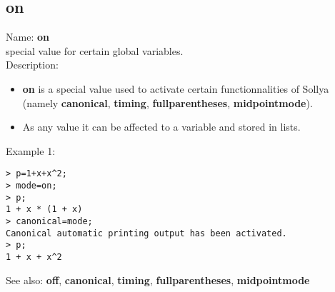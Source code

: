 \subsection{ on }
\noindent Name: \textbf{on}\\
special value for certain global variables.\\

\noindent Description: \begin{itemize}

\item \textbf{on} is a special value used to activate certain functionnalities of Sollya
   (namely \textbf{canonical}, \textbf{timing}, \textbf{fullparentheses}, \textbf{midpointmode}).

\item As any value it can be affected to a variable and stored in lists.
\end{itemize}
\noindent Example 1: 
\begin{center}\begin{minipage}{15cm}\begin{Verbatim}[frame=single]
> p=1+x+x^2;
> mode=on;
> p;
1 + x * (1 + x)
> canonical=mode;
Canonical automatic printing output has been activated.
> p;
1 + x + x^2
\end{Verbatim}
\end{minipage}\end{center}
See also: \textbf{off}, \textbf{canonical}, \textbf{timing}, \textbf{fullparentheses}, \textbf{midpointmode}

